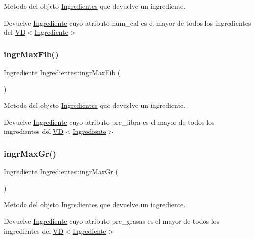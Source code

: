 Metodo del objeto \hyperlink{classIngredientes}{Ingredientes} que devuelve un ingrediente. 

\begin{DoxyReturn}{Devuelve}
\hyperlink{classIngrediente}{Ingrediente} cuyo atributo num\+\_\+cal es el mayor de todos los ingredientes del \hyperlink{classVD}{V\+D$<$\+Ingrediente$>$} 
\end{DoxyReturn}
\mbox{\label{classIngredientes_a284759d98988068f7214372c06b28f12}} 
\subsubsection{\texorpdfstring{ingr\+Max\+Fib()}{ingrMaxFib()}}
{\footnotesize\ttfamily \hyperlink{classIngrediente}{Ingrediente} Ingredientes\+::ingr\+Max\+Fib (\begin{DoxyParamCaption}{ }\end{DoxyParamCaption})}



Metodo del objeto \hyperlink{classIngredientes}{Ingredientes} que devuelve un ingrediente. 

\begin{DoxyReturn}{Devuelve}
\hyperlink{classIngrediente}{Ingrediente} cuyo atributo prc\+\_\+fibra es el mayor de todos los ingredientes del \hyperlink{classVD}{V\+D$<$\+Ingrediente$>$} 
\end{DoxyReturn}
\mbox{\label{classIngredientes_a5584a2f2287749acc53c711ed615fe85}} 
\subsubsection{\texorpdfstring{ingr\+Max\+Gr()}{ingrMaxGr()}}
{\footnotesize\ttfamily \hyperlink{classIngrediente}{Ingrediente} Ingredientes\+::ingr\+Max\+Gr (\begin{DoxyParamCaption}{ }\end{DoxyParamCaption})}



Metodo del objeto \hyperlink{classIngredientes}{Ingredientes} que devuelve un ingrediente. 

\begin{DoxyReturn}{Devuelve}
\hyperlink{classIngrediente}{Ingrediente} cuyo atributo prc\+\_\+grasas es el mayor de todos los ingredientes del \hyperlink{classVD}{V\+D$<$\+Ingrediente$>$} 
\end{DoxyReturn}
\mbox{\label{classIngredientes_a57b557e7f73e39a0e05d6d520e796645}} 

